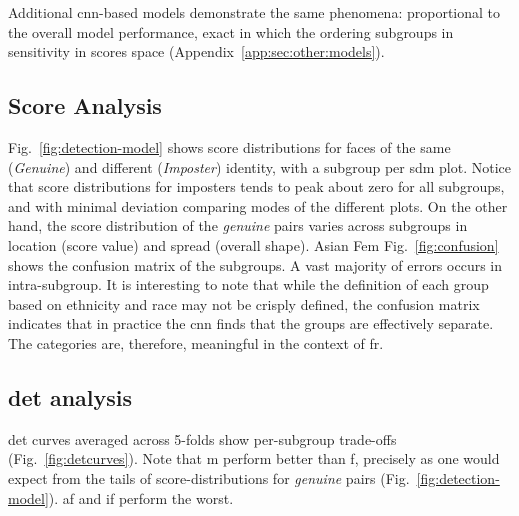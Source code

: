 Additional \gls{cnn}-based models demonstrate the same phenomena: proportional to the overall model performance, exact in which the ordering subgroups in sensitivity in scores space (Appendix~\ref{app:sec:other:models}).





\subsection{Score Analysis}
Fig.~\ref{fig:detection-model} shows score distributions for faces of the same (\ie \emph{Genuine}) and different (\ie \emph{Imposter}) identity, with a subgroup per \gls{sdm} plot. Notice that score distributions for imposters tends to peak about zero for all subgroups, and with minimal deviation comparing modes of the different plots. On the other hand, the score distribution of the \emph{genuine} pairs varies across subgroups in location (\ie score value) and spread (\ie overall shape). Asian Fem
Fig.~\ref{fig:confusion} shows the confusion matrix of the subgroups. A vast majority of errors occurs in intra-subgroup. It is interesting to note that while the definition of  each group  based on ethnicity and race may not be crisply defined, the confusion matrix indicates that in practice the \gls{cnn} finds that the groups are effectively separate. The categories are, therefore, meaningful in the context of \gls{fr}.


\subsection{\gls{det} analysis}

\gls{det} curves averaged across 5-folds show per-subgroup trade-offs (Fig.~\ref{fig:detcurves}). Note that \gls{m} perform better than \gls{f}, precisely as one would expect from the tails of score-distributions for \emph{genuine} pairs (Fig.~\ref{fig:detection-model}). \Gls{af} and \gls{if} perform the worst.


